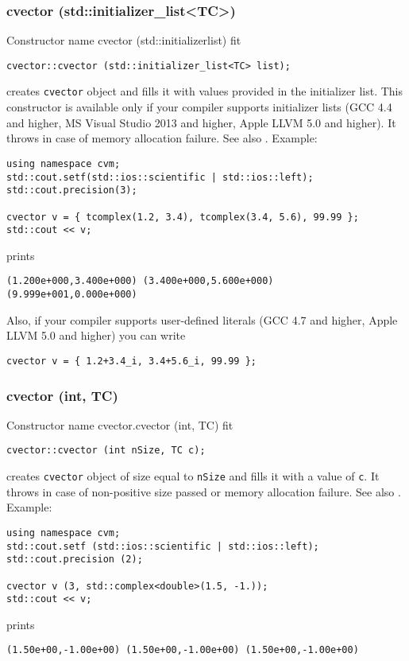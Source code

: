 \subsubsection{cvector (std::initializer\_list<TC>)}
Constructor%
\pdfdest name {cvector (std::initializerlist)} fit
\begin{verbatim}
cvector::cvector (std::initializer_list<TC> list);
\end{verbatim}
creates \verb"cvector" object and fills it with values provided in the initializer list.
This constructor is available only if your compiler supports initializer lists
(GCC 4.4 and higher, MS Visual Studio 2013 and higher, Apple LLVM 5.0 and higher).
It throws  
in case of memory allocation failure.
See also .
Example:
\begin{Verbatim}
using namespace cvm;
std::cout.setf(std::ios::scientific | std::ios::left);
std::cout.precision(3);

cvector v = { tcomplex(1.2, 3.4), tcomplex(3.4, 5.6), 99.99 };
std::cout << v;
\end{Verbatim}
prints
\begin{Verbatim}
(1.200e+000,3.400e+000) (3.400e+000,5.600e+000) (9.999e+001,0.000e+000)
\end{Verbatim}
Also, if your compiler supports user-defined literals (GCC 4.7 and higher, Apple LLVM 5.0 and higher)
you can write
\begin{Verbatim}
cvector v = { 1.2+3.4_i, 3.4+5.6_i, 99.99 };
\end{Verbatim}
\newpage




\subsubsection{cvector (int, TC)}
Constructor%
\pdfdest name {cvector.cvector (int, TC)} fit
\begin{verbatim}
cvector::cvector (int nSize, TC c);
\end{verbatim}
creates  \verb"cvector" object of size equal to \verb"nSize"
and fills it with a value of \verb"c".
It throws  
in case of non-positive size passed or memory allocation failure.
See also .
Example:
\begin{Verbatim}
using namespace cvm;
std::cout.setf (std::ios::scientific | std::ios::left);
std::cout.precision (2);

cvector v (3, std::complex<double>(1.5, -1.));
std::cout << v;
\end{Verbatim}
prints
\begin{Verbatim}
(1.50e+00,-1.00e+00) (1.50e+00,-1.00e+00) (1.50e+00,-1.00e+00)
\end{Verbatim}
\newpage



